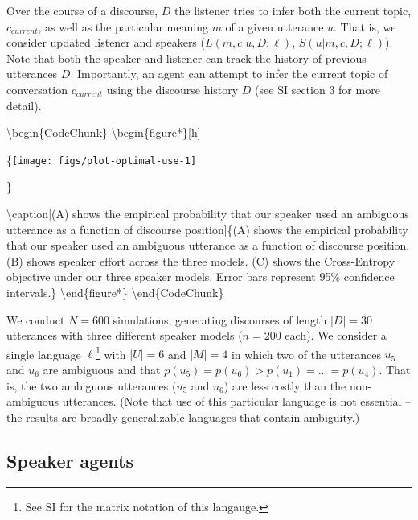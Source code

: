 \documentclass[10pt, letterpaper]{article}
\begin{document}
Over the course of a discourse, \(D\) the listener tries to infer both
the current topic, \(c_{current}\), as well as the particular meaning
\(m\) of a given utterance \(u\). That is, we consider updated listener
and speakers (\(L(m, c|u,D;\ell)\), \(S(u|m,c,D;\ell)\)). Note that both
the speaker and listener can track the history of previous utterances
\(D\). Importantly, an agent can attempt to infer the current topic of
conversation \(c_{current}\) using the discourse history \(D\) (see SI
section 3 for more detail).\par

\textbackslash{}begin\{CodeChunk\}
\textbackslash{}begin\{figure*\}{[}h{]}

\{\centering \texttt{[image: figs/plot-optimal-use-1]}

\}

\textbackslash{}caption{[}(A) shows the empirical probability that our
speaker used an ambiguous utterance as a function of discourse
position{]}\{(A) shows the empirical probability that our speaker used
an ambiguous utterance as a function of discourse position. (B) shows
speaker effort across the three models. (C) shows the Cross-Entropy
objective under our three speaker models. Error bars represent 95\%
confidence intervals.\}\label{fig:plot-optimal-use}
\textbackslash{}end\{figure*\} \textbackslash{}end\{CodeChunk\}

We conduct \(N=600\) simulations, generating discourses of length
\(|D|=30\) utterances with three different speaker models (\(n=200\)
each). We consider a single language
\(\ell\)\footnote{See SI for the matrix notation of this langauge.} with
\(|U|=6\) and \(|M|=4\) in which two of the utterances \(u_5\) and
\(u_6\) are ambiguous and that
\(p(u_5) = p(u_6) > p(u_{1})=\dots=p(u_{4})\). That is, the two
ambiguous utterances (\(u_5\) and \(u_6\)) are less costly than the
non-ambiguous utterances. (Note that use of this particular language is
not essential -- the results are broadly generalizable languages that
contain ambiguity.)\par

\subsection{Speaker agents}\label{speaker-agents}
\end{document}

